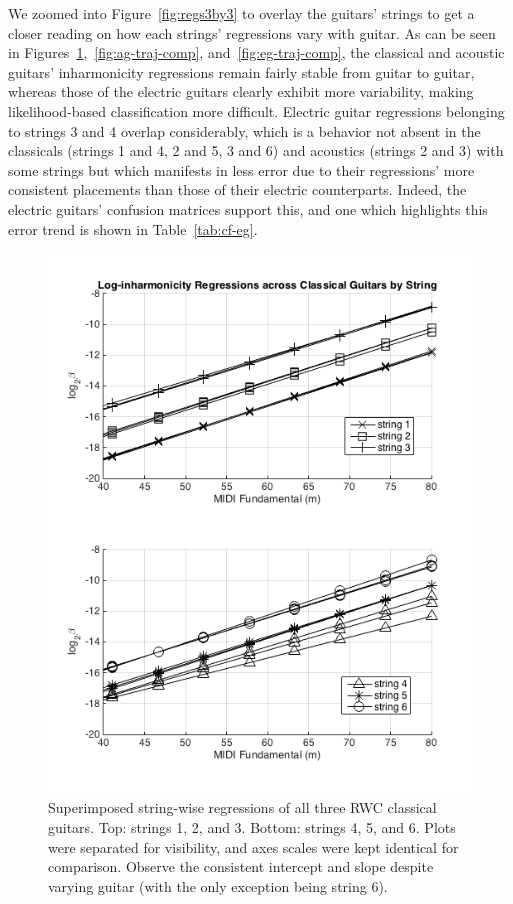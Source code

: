 \documentclass[12pt]{cmuthesis}
\begin{document}
We zoomed into Figure~\ref{fig:regs3by3} to overlay the guitars' strings to get a closer reading on how each strings' regressions vary with guitar. As can be seen in Figures~\ref{fig:cg-traj-comp},~\ref{fig:ag-traj-comp}, and~\ref{fig:eg-traj-comp}, the classical and acoustic guitars' inharmonicity regressions remain fairly stable from guitar to guitar, whereas those of the electric guitars clearly exhibit more variability, making likelihood-based classification more difficult. Electric guitar regressions belonging to strings 3 and 4 overlap considerably, which is a behavior not absent in the classicals (strings 1 and 4, 2 and 5, 3 and 6) and acoustics (strings 2 and 3) with some strings but which manifests in less error due to their regressions' more consistent placements than those of their electric counterparts. Indeed, the electric guitars' confusion matrices support this, and one which highlights this error trend is shown in Table~\ref{tab:cf-eg}. 

\begin{figure}[!htbp] 
\centering
\includegraphics[scale=0.75]{traj-compare-cg}
\caption{Superimposed string-wise regressions of all three RWC classical guitars. Top: strings 1, 2, and 3. Bottom: strings 4, 5, and 6. Plots were separated for visibility, and axes scales were kept identical for comparison. Observe the consistent intercept and slope despite varying guitar (with the only exception being string 6).}
\label{fig:cg-traj-comp}
\end{figure}
\end{document}

